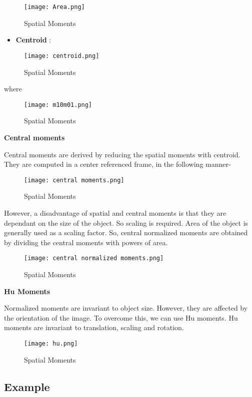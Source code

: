 \documentclass[]{article}
\providecommand{\tightlist}{%
  \setlength{\itemsep}{0pt}\setlength{\parskip}{0pt}}
\begin{document}
\begin{figure}[htbp]
\centering
\texttt{[image: Area.png]}
\caption{Spatial Moments}
\end{figure}

\begin{itemize}
\tightlist
\item
  \textbf{Centroid} :
\end{itemize}

\begin{figure}[htbp]
\centering
\texttt{[image: centroid.png]}
\caption{Spatial Moments}
\end{figure}

where

\begin{figure}[htbp]
\centering
\texttt{[image: m10m01.png]}
\caption{Spatial Moments}
\end{figure}

\textbf{Central moments}

Central moments are derived by reducing the spatial moments with
centroid. They are computed in a center referenced frame, in the
following manner-

\begin{figure}[htbp]
\centering
\texttt{[image: central moments.png]}
\caption{Spatial Moments}
\end{figure}

However, a disadvantage of spatial and central moments is that they are
dependant on the size of the object. So scaling is required. Area of the
object is generally used as a scaling factor. So, central normalized
moments are obtained by dividing the central moments with powers of
area.

\begin{figure}[htbp]
\centering
\texttt{[image: central normalized moments.png]}
\caption{Spatial Moments}
\end{figure}

\textbf{Hu Moments}

Normalized moments are invariant to object size. However, they are
affected by the orientation of the image. To overcome this, we can use
Hu moments. Hu moments are invariant to translation, scaling and
rotation.

\begin{figure}[htbp]
\centering
\texttt{[image: hu.png]}
\caption{Spatial Moments}
\end{figure}

\subsection{Example}\label{example}
\end{document}
